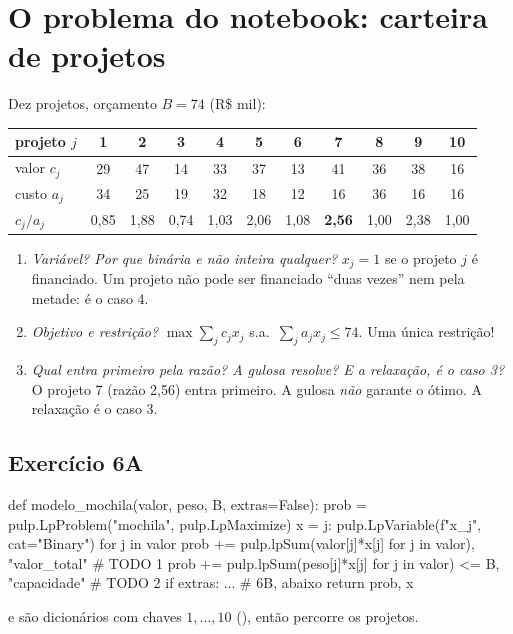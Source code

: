 \section{O problema do notebook: carteira de projetos}

Dez projetos, orçamento $B=74$ (R\$ mil):
\begin{center}
\small
\begin{tabular}{l*{10}{c}}
\toprule
projeto $j$ & 1&2&3&4&5&6&7&8&9&10\\
\midrule
valor $c_j$ & 29&47&14&33&37&13&41&36&38&16\\
custo $a_j$ & 34&25&19&32&18&12&16&36&16&16\\
$c_j/a_j$ & 0,85&1,88&0,74&1,03&2,06&1,08&\textbf{2,56}&1,00&2,38&1,00\\
\bottomrule
\end{tabular}
\end{center}

\begin{discussao}
\begin{enumerate}
  \item \emph{Variável? Por que binária e não inteira qualquer?} $x_j=1$ se o projeto $j$ é financiado. Um projeto
  não pode ser financiado ``duas vezes'' nem pela metade: é o caso 4.
  \item \emph{Objetivo e restrição?} $\max\sum_jc_jx_j$ s.a.\ $\sum_ja_jx_j\le74$. Uma única restrição!
  \item \emph{Qual entra primeiro pela razão? A gulosa resolve? E a relaxação, é o caso 3?} O projeto 7 (razão 2,56)
  entra primeiro. A gulosa \emph{não} garante o ótimo. A relaxação é o caso 3.
\end{enumerate}
\end{discussao}

\subsection*{Exercício 6A}
\begin{codigo}
def modelo_mochila(valor, peso, B, extras=False):
    prob = pulp.LpProblem("mochila", pulp.LpMaximize)
    x = {j: pulp.LpVariable(f"x_{j}", cat="Binary") for j in valor}
    prob += pulp.lpSum(valor[j]*x[j] for j in valor), "valor_total"       # TODO 1
    prob += pulp.lpSum(peso[j]*x[j] for j in valor) <= B, "capacidade"    # TODO 2
    if extras:
        ...                                                               # 6B, abaixo
    return prob, x
\end{codigo}
 e  são dicionários com chaves $1,\dots,10$ (), então
 percorre os projetos.

